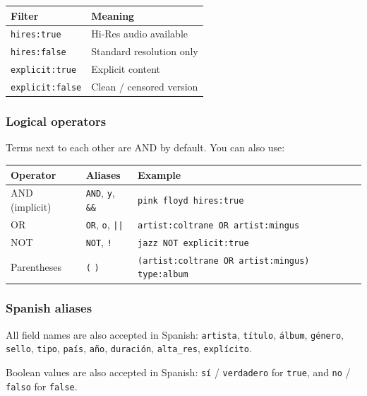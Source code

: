 \documentclass[11pt,a4paper]{article}
\begin{document}
\begin{center}
\begin{tabular}{@{}ll@{}}
\toprule
\textbf{Filter}         & \textbf{Meaning} \\
\midrule
\texttt{hires:true}     & Hi-Res audio available \\
\texttt{hires:false}    & Standard resolution only \\
\texttt{explicit:true}  & Explicit content \\
\texttt{explicit:false} & Clean / censored version \\
\bottomrule
\end{tabular}
\end{center}

\subsubsection{Logical operators}

Terms next to each other are AND by default.  You can also use:

\begin{center}
\begin{tabular}{@{}lll@{}}
\toprule
\textbf{Operator} & \textbf{Aliases} & \textbf{Example} \\
\midrule
AND (implicit) & \texttt{AND}, \texttt{y}, \texttt{\&\&} & \texttt{pink floyd hires:true} \\
OR             & \texttt{OR}, \texttt{o}, \texttt{||} & \texttt{artist:coltrane OR artist:mingus} \\
NOT            & \texttt{NOT}, \texttt{!}            & \texttt{jazz NOT explicit:true} \\
Parentheses    & \texttt{(} \texttt{)}               & \texttt{(artist:coltrane OR artist:mingus) type:album} \\
\bottomrule
\end{tabular}
\end{center}

\subsubsection{Spanish aliases}

All field names are also accepted in Spanish:
\texttt{artista}, \texttt{título}, \texttt{álbum}, \texttt{género},
\texttt{sello}, \texttt{tipo}, \texttt{país}, \texttt{año},
\texttt{duración}, \texttt{alta\_res}, \texttt{explícito}.

Boolean values are also accepted in Spanish: \texttt{sí} / \texttt{verdadero}
for \texttt{true}, and \texttt{no} / \texttt{falso} for \texttt{false}.
\end{document}
